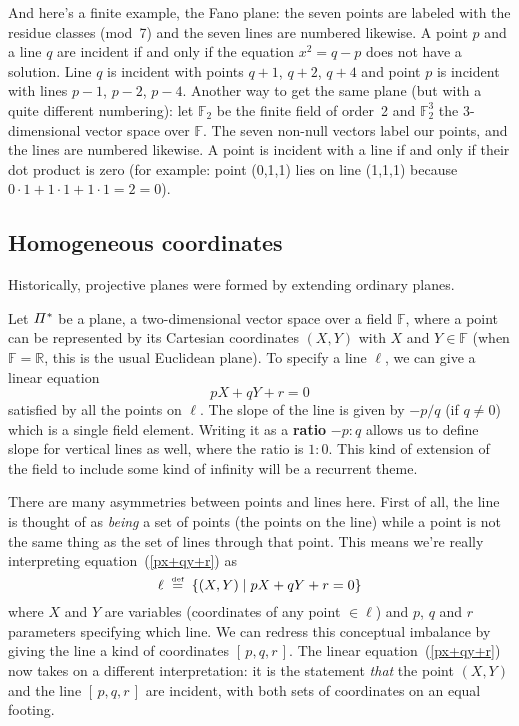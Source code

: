 \documentclass[12pt]{article}
\def\Rset{\mathbb{R}}
\def\Fset{\mathbb{F}}
\def\isdef{\mathrel{\mathop{=}\limits^{\smash{\hbox{\tiny def}}}}}
\begin{document}
And here's a finite example, the Fano plane: the seven {\sc point}s are labeled
with the residue classes (mod~7) and the seven {\sc line}s are numbered likewise.
A {\sc point} $p$ and a {\sc line} $q$ are incident if and only if the equation $x^2=q-p$ does not
have a solution. Line $q$ is incident with {\sc point}s $q+1$, $q+2$, $q+4$ and
{\sc point} $p$ is incident with {\sc line}s $p-1$, $p-2$, $p-4$. Another way to get the
same plane (but with a quite different numbering): let $\Fset_2$ be the finite
field of order~2 and $\Fset_2^3$ the 3-dimensional vector space over $\Fset$.
The seven non-null vectors label our {\sc point}s, and the {\sc line}s are numbered
likewise. A {\sc point} is incident with a {\sc line} if and only if their dot product is zero
(for example: {\sc point} (0,1,1) lies on {\sc line} (1,1,1) because $0\cdot1
+1\cdot1 + 1\cdot1 = 2 = 0$).

\clearpage
\subsection*{Homogeneous coordinates}

Historically, projective planes were formed by extending ordinary planes.

Let $\mit\Pi^*$ be a plane, a two-dimensional vector space over a field
$\Fset$, where a point can be represented by its Cartesian coordinates $(X,Y)$
with $X$ and $Y\in\Fset$ (when $\Fset=\Rset$, this is the usual
Euclidean plane). To specify a line $\ell$, we can give a linear equation
\begin{equation}\label{px+qy+r}
  pX + qY + r = 0
\end{equation}
satisfied by all the points on $\ell$. The slope of the line is given by
$-p/q$ (if $q\ne0$) which is a single field element. Writing it as a
{\bf ratio} $-p:q$ allows us to define slope for vertical lines as well,
where the ratio is $1:0$. This kind of extension of the field to include
some kind of infinity will be a recurrent theme.

There are many asymmetries between points and lines here. First of all, the
line is thought of as {\em being\/} a set of points (the points on the line)
while a point is not the same thing as the set of lines through that
point. This means we're really interpreting equation~(\ref{px+qy+r}) as
$$
  \ell \;\isdef\; \{ (X,Y) \mid pX+qY+r=0 \}
$$
where $X$ and $Y$ are variables (coordinates of any point $\in\ell$) and $p$,
$q$ and $r$ parameters specifying which line. We can redress this conceptual
imbalance by giving the line a kind of coordinates $[\,p,q,r\,]$. The linear
equation~(\ref{px+qy+r}) now takes on a different interpretation: it is the
statement {\em that\/} the point $(X,Y)$ and the line $[\,p,q,r\,]$ are
incident, with both sets of coordinates on an equal footing.
\end{document}
